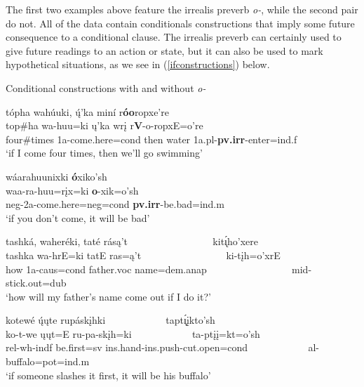 The first two examples above feature the irrealis preverb \textit{o-}, while the second pair do not. All of the data contain conditionals constructions that imply some future consequence to a conditional clause. The irrealis preverb can certainly used to give future readings to an action or state, but it can also be used to mark hypothetical situations, as we see in (\ref{ifconstructions}) below. 


\begin{exe}

\item\label{ifconstructions} Conditional constructions with and without \textit{o-}

	\begin{xlist}
	
	\item \glll tópha wahúuki, ų́'ka miní r\textbf{óo}ropxe're\\
	top\#ha wa-huu=ki ų'ka wrį r\textbf{V}-o-ropxE=o're\\
	\textnormal{four\#times} 1a-\textnormal{come.here}=cond \textnormal{then} \textnormal{water} 1a.pl-\textbf{pv.irr}-\textnormal{enter}=ind.f\\
	\glt `if I come four times, then we'll go swimming' \citep[106]{hollow1973a}
	
	\item \glll wáarahuunixki \textbf{ó}xiko'sh\\
	waa-ra-huu=rįx=ki \textbf{o}-xik=o'sh\\
	neg-2a-\textnormal{come.here}=neg=cond \textbf{pv.irr}-\textnormal{be.bad}=ind.m\\
	\glt `if you don't come, it will be bad' \citep[53]{hollow1973b}
	
	
	\item \glll tashká, waheréki, taté rásą't ~ ~ ~ ~ ~ ~ ~ ~ ~ ~ kit\'{ı̨}ho'xere\\
	tashka wa-hrE=ki tatE ras=ą't ~ ~ ~ ~ ~ ~ ~ ~ ~ ~ ki-tįh=o'xrE\\
	\textnormal{how} 1a-caus=cond \textnormal{father}.voc \textnormal{name}=dem.anap ~ ~ ~ ~ ~ ~ ~ ~ ~ ~ mid-\textnormal{stick.out}=dub\\
	\glt `how will my father's name come out if I do it?' \citep[61]{hollow1973a}
	
	\item \glll kotewé ų́ųte rupáskįhki ~ ~ ~ ~ ~ ~ ~  tapt\'{ı̨}įkto'sh\\
	ko-t-we ųųt=E ru-pa-skįh=ki ~ ~ ~ ~ ~ ~ ~  ta-ptįį=kt=o'sh\\
	rel-wh-indf \textnormal{be.first}=sv ins.hand-ins.push-\textnormal{cut.open}=cond ~ ~ ~ ~ ~ ~ ~  al-\textnormal{buffalo}=pot=ind.m\\
	\glt `if someone slashes it first, it will be his buffalo' \citep[7]{hollow1973b}
	
	\end{xlist}

\end{exe}


